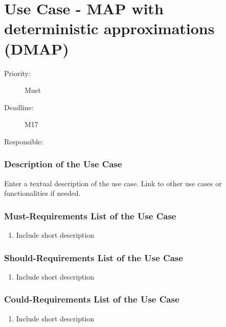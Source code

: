 \newpage
\section{Use Case - MAP with deterministic approximations (DMAP)}
\label{UseCase:DMAP}

\begin{description}
\item[Priority:] Must
\item[Deadline:] M17
\item[Responsible:]
\end{description}

\subsubsection*{Description of the Use Case}

Enter a textual description of the use case. Link to other use cases or functionalities if needed. 


\subsubsection*{Must-Requirements List of the Use Case}

\begin{enumerate}
\item Include short description
\end{enumerate}

\subsubsection*{Should-Requirements List of the Use Case}

\begin{enumerate}
\item Include short description
\end{enumerate}

\subsubsection*{Could-Requirements List of the Use Case}

\begin{enumerate}
\item Include short description
\end{enumerate}



